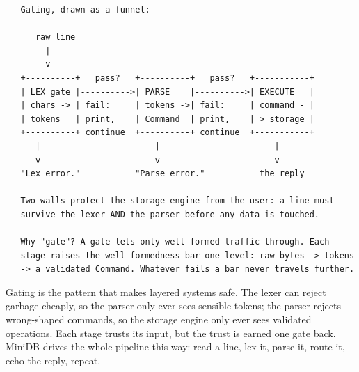 \begin{verbatim}
   Gating, drawn as a funnel:

      raw line
        |
        v
   +----------+   pass?   +----------+   pass?   +-----------+
   | LEX gate |---------->| PARSE    |---------->| EXECUTE   |
   | chars -> | fail:     | tokens ->| fail:     | command - |
   | tokens   | print,    | Command  | print,    | > storage |
   +----------+ continue  +----------+ continue  +-----------+
      |                       |                       |
      v                       v                       v
   "Lex error."           "Parse error."           the reply

   Two walls protect the storage engine from the user: a line must
   survive the lexer AND the parser before any data is touched.

   Why "gate"? A gate lets only well-formed traffic through. Each
   stage raises the well-formedness bar one level: raw bytes -> tokens
   -> a validated Command. Whatever fails a bar never travels further.
\end{verbatim}

Gating is the pattern that makes layered systems safe. The lexer can
reject garbage cheaply, so the parser only ever sees sensible tokens;
the parser rejects wrong-shaped commands, so the storage engine only
ever sees validated operations. Each stage trusts its input, but the
trust is earned one gate back. MiniDB drives the whole pipeline this
way: read a line, lex it, parse it, route it, echo the reply, repeat.


